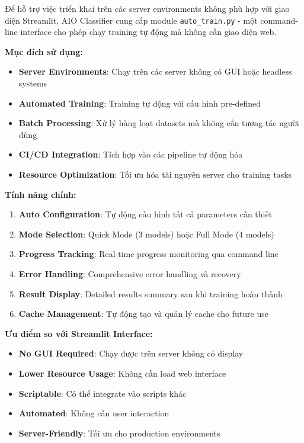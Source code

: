 Để hỗ trợ việc triển khai trên các server environments không phù hợp với giao diện Streamlit, AIO Classifier cung cấp module \texttt{auto\_train.py} - một command-line interface cho phép chạy training tự động mà không cần giao diện web.

\textbf{Mục đích sử dụng:}
\begin{itemize}
    \item \textbf{Server Environments}: Chạy trên các server không có GUI hoặc headless systems
    \item \textbf{Automated Training}: Training tự động với cấu hình pre-defined
    \item \textbf{Batch Processing}: Xử lý hàng loạt datasets mà không cần tương tác người dùng
    \item \textbf{CI/CD Integration}: Tích hợp vào các pipeline tự động hóa
    \item \textbf{Resource Optimization}: Tối ưu hóa tài nguyên server cho training tasks
\end{itemize}

\textbf{Tính năng chính:}
\begin{enumerate}
    \item \textbf{Auto Configuration}: Tự động cấu hình tất cả parameters cần thiết
    \item \textbf{Mode Selection}: Quick Mode (3 models) hoặc Full Mode (4 models)
    \item \textbf{Progress Tracking}: Real-time progress monitoring qua command line
    \item \textbf{Error Handling}: Comprehensive error handling và recovery
    \item \textbf{Result Display}: Detailed results summary sau khi training hoàn thành
    \item \textbf{Cache Management}: Tự động tạo và quản lý cache cho future use
\end{enumerate}

\textbf{Ưu điểm so với Streamlit Interface:}
\begin{itemize}
    \item \textbf{No GUI Required}: Chạy được trên server không có display
    \item \textbf{Lower Resource Usage}: Không cần load web interface
    \item \textbf{Scriptable}: Có thể integrate vào scripts khác
    \item \textbf{Automated}: Không cần user interaction
    \item \textbf{Server-Friendly}: Tối ưu cho production environments
\end{itemize}

